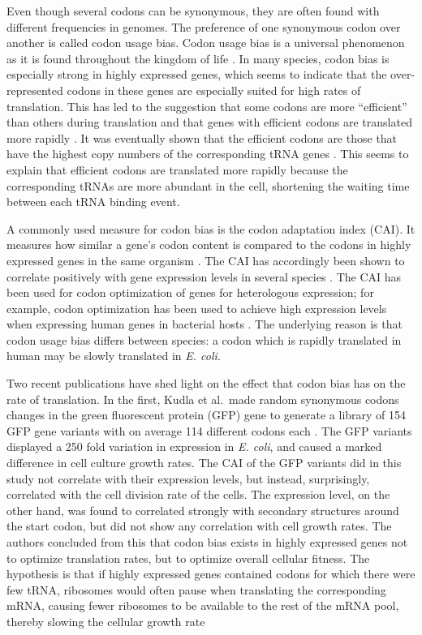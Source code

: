Even though several codons can be synonymous, they are often found with
different frequencies in genomes. The preference of one synonymous codon over
another is called codon usage bias. Codon usage bias is a universal phenomenon
as it is found throughout the kingdom of life \cite{sharp_codon_1988}. In many
species, codon bias is especially strong in highly expressed genes, which seems
to indicate that the over-represented codons in these genes are especially
suited for high rates of translation.  This has led to the suggestion that some
codons are more ``efficient'' than others during translation and that genes
with efficient codons are translated more rapidly \cite{moriyama_gene_1998}. It
was eventually shown that the efficient codons are those that have the highest
copy numbers of the corresponding tRNA genes \cite{reis_solving_2004,
elf_selective_2003}. This seems to explain that efficient codons are translated
more rapidly because the corresponding tRNAs are more abundant in the cell,
shortening the waiting time between each tRNA binding event.

A commonly used measure for codon bias is the codon adaptation index (CAI). It
measures how similar a gene's codon content is compared to the codons in highly
expressed genes in the same organism \cite{sharp_codon_1987}. The CAI has
accordingly been shown to correlate positively with gene expression levels in
several species \cite{duret_expression_1999, jansen_revisiting_2003}. The CAI
has been used for codon optimization of genes for heterologous expression;
for example, codon optimization has been used to achieve high expression levels
when expressing human genes in bacterial hosts \cite{gustafsson_codon_2004}.
The underlying reason is that codon usage bias differs between species: a codon
which is rapidly translated in human may be slowly translated in \textit{E.
coli}.

Two recent publications have shed light on the effect that codon bias has on
the rate of translation. In the first, Kudla et al.\ made random synonymous
codons changes in the green fluorescent protein (GFP) gene to generate a
library of 154 GFP gene variants with on average 114 different codons each
\cite{kudla_coding-sequence_2009}. The GFP variants displayed a 250 fold
variation in expression in \textit{E. coli}, and caused a marked difference in
cell culture growth rates. The CAI of the GFP variants did in this study not
correlate with their expression levels, but instead, surprisingly, correlated
with the cell division rate of the cells. The expression level, on the other
hand, was found to correlated strongly with secondary structures around the
start codon, but did not show any correlation with cell growth rates. The
authors concluded from this that codon bias exists in highly expressed genes
not to optimize translation rates, but to optimize overall cellular fitness.
The hypothesis is that if highly expressed genes contained codons for which
there were few tRNA, ribosomes would often pause when translating the
corresponding mRNA, causing fewer ribosomes to be available to the rest of the
mRNA pool, thereby slowing the cellular growth rate
\cite{kudla_coding-sequence_2009}

